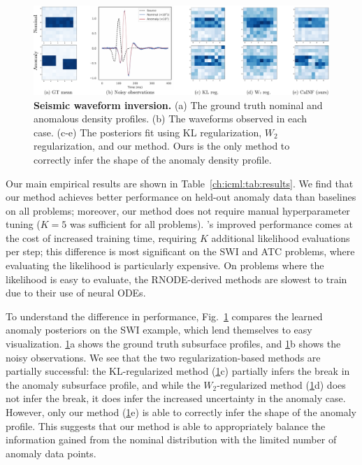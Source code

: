 

\begin{figure}[tb]
    \centering
    \includegraphics[width=\linewidth]{images/icml/swi_results/swi_summary.pdf}
    \caption{\textbf{Seismic waveform inversion.} (a) The ground truth nominal and anomalous density profiles. (b) The waveforms observed in each case. (c-e) The posteriors fit using KL regularization, $W_2$ regularization, and our \ouralg{} method. Ours is the only method to correctly infer the shape of the anomaly density profile.}
    \label{ch:icml:fig:swi_results}
\end{figure}

Our main empirical results are shown in Table~\ref{ch:icml:tab:results}. We find that our method achieves better performance on held-out anomaly data than baselines on all problems; moreover, our method does not require manual hyperparameter tuning ($K=5$ was sufficient for all problems). \ouralg{}'s improved performance comes at the cost of increased training time, requiring $K$ additional likelihood evaluations per step; this difference is most significant on the SWI and ATC problems, where evaluating the likelihood is particularly expensive. On problems where the likelihood is easy to evaluate, the RNODE-derived methods are slowest to train due to their use of neural ODEs.

To understand the difference in performance, Fig.~\ref{ch:icml:fig:swi_results} compares the learned anomaly posteriors on the SWI example, which lend themselves to easy visualization. \ref{ch:icml:fig:swi_results}a shows the ground truth subsurface profiles, and \ref{ch:icml:fig:swi_results}b shows the noisy observations.
%
We see that the two regularization-based methods are partially successful: the KL-regularized method (\ref{ch:icml:fig:swi_results}c) partially infers the break in the anomaly subsurface profile, and while the $W_2$-regularized method (\ref{ch:icml:fig:swi_results}d) does not infer the break, it does infer the increased uncertainty in the anomaly case. However, only our method (\ref{ch:icml:fig:swi_results}e) is able to correctly infer the shape of the anomaly profile. This suggests that our method is able to appropriately balance the information gained from the nominal distribution with the limited number of anomaly data points.


